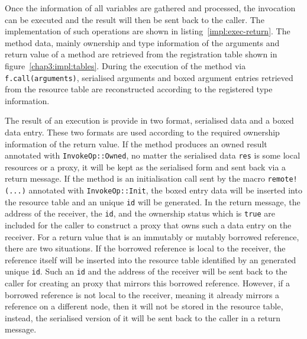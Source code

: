 Once the information of all variables are gathered and processed, the invocation can be executed and the result will then be sent back to the caller. The implementation of such operations are shown in listing~\ref{impl:exec-return}. The method data, mainly ownership and type information of the arguments and return value of a method are retrieved from the registration table shown in figure~\ref{chap3:impl:tables}. During the execution of the method via \texttt{f.call(arguments)}, serialised arguments and boxed argument entries retrieved from the resource table are reconstructed according to the registered type information.

The result of an execution is provide in two format, serialised data and a boxed data entry. These two formats are used according to the required ownership information of the return value. If the method produces an owned result annotated with \texttt{InvokeOp::Owned}, no matter the serialised data \texttt{res} is some local resources or a proxy, it will be kept as the serialised form and sent back via a return message. If the method is an initialisation call sent by the macro \texttt{remote!(...)} annotated with \texttt{InvokeOp::Init}, the boxed entry data will be inserted into the resource table and an unique \texttt{id} will be generated. In the return message, the address of the receiver, the \texttt{id}, and the ownership status which is \texttt{true} are included for the caller to construct a proxy that owns such a data entry on the receiver. For a return value that is an immutably or mutably borrowed reference, there are two situations. If the borrowed reference is local to the receiver, the reference itself will be inserted into the resource table identified by an generated unique \texttt{id}. Such an \texttt{id} and the address of the receiver will be sent back to the caller for creating an proxy that mirrors this borrowed reference. However, if a borrowed reference is not local to the receiver, meaning it already mirrors a reference on a different node, then it will not be stored in the resource table, instead, the serialised version of it will be sent back to the caller in a return message.

